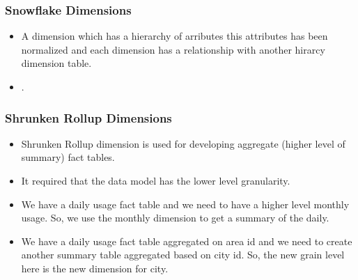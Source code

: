 \begin{frame}
    \frametitle{Snowflake Dimensions}
    \begin{itemize}
        \item A dimension which has a hierarchy of arributes this attributes has been normalized and each
        dimension has a relationship with another hirarcy dimension table.\\
        \item {}.
    \end{itemize}
    \centering
    
\end{frame}
\begin{frame}
    \frametitle{Shrunken Rollup Dimensions}%
    \begin{itemize}[<+->]    	
		\item Shrunken Rollup dimension is used for developing aggregate (higher level of summary) fact tables. 
		\item It required that the data model has the lower level granularity.
	\end{itemize}
		\begin{example}
		    \begin{itemize}[<+->]    	
			\item We have a daily usage fact table and we need to have a higher level monthly usage. So, we use the monthly dimension to get a summary of the daily.
			\item We have a daily usage fact table aggregated on area id and we need to create another summary table aggregated based on city id. So, the new grain level here is the new dimension for city.
			\end{itemize}
		\end{example}
\end{frame}
